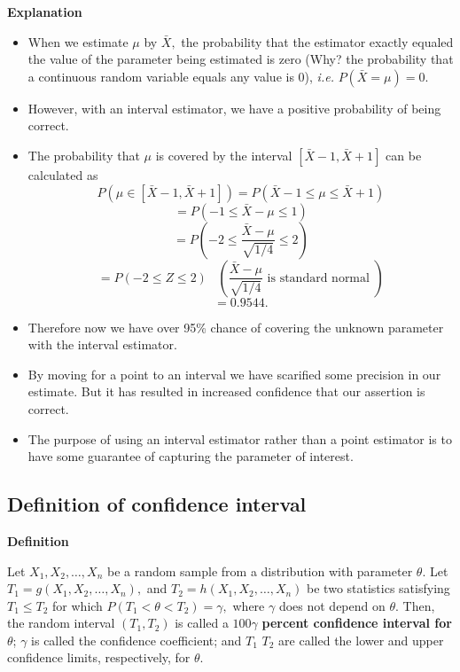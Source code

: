\documentclass[]{book}
\begin{document}
\textbf{Explanation}

\begin{itemize}
\item
  When we estimate \(\mu\) by \(\bar{X},\) the probability that the estimator exactly equaled the value of the parameter being estimated is zero (Why? the probability that a continuous random variable equals any value is 0), \emph{i.e.} \(P(\bar{X}=\mu) = 0.\)
\item
  However, with an interval estimator, we have a positive probability of being correct.
\item
  The probability that \(\mu\) is covered by the interval \([\bar{X}-1, \bar{X}+1]\) can be calculated as
  \[P(\mu \in [\bar{X}-1, \bar{X}+1])= P(\bar{X}-1 \leq \mu\leq \bar{X}+1)\]
  \[ = P(-1 \leq \bar{X} - \mu\leq 1)\]
  \[ = P(- 2\leq \frac{\bar{X} - \mu}{\sqrt{1/4}}\leq 2)\]
  \[ = P(- 2\leq Z\leq 2)\;\;\; \left(\frac{\bar{X} - \mu}{\sqrt{1/4}} \text{ is standard normal }\right)\]
  \[=0.9544.\]
\item
  Therefore now we have over 95\% chance of covering the unknown parameter with the interval estimator.
\item
  By moving for a point to an interval we have scarified some precision in our estimate. But it has resulted in increased confidence that our assertion is correct.
\item
  The purpose of using an interval estimator rather than a point estimator is to have some guarantee of capturing the parameter of interest.
\end{itemize}

\hypertarget{definition-of-confidence-interval}{%
\subsection{Definition of confidence interval}\label{definition-of-confidence-interval}}

\textbf{Definition}

Let \(X_1, X_2, \dots, X_n\) be a random sample from a distribution with parameter \(\theta.\) Let \(T_1 = g(X_1, X_2, \dots, X_n),\) and \(T_2 = h(X_1, X_2, \dots, X_n)\) be two statistics satisfying \(T_1 \leq T_2\) for which \(P(T_1 < \theta < T_2)= \gamma,\) where \(\gamma\) does not depend on \(\theta\). Then, the random interval \((T_1, T_2)\) is called a \(100\gamma\) \textbf{percent confidence interval for} \(\theta\); \(\gamma\) is called the confidence coefficient; and \(T_1\) \(T_2\) are called the lower and upper confidence limits, respectively, for \(\theta.\)
\end{document}
